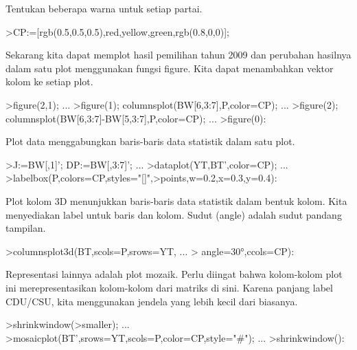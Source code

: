 \documentclass[a4paper,10pt]{article}
\begin{document}
\begin{eulernotebook}
\begin{eulercomment}
Tentukan beberapa warna untuk setiap partai.
\end{eulercomment}
\begin{eulerprompt}
>CP:=[rgb(0.5,0.5,0.5),red,yellow,green,rgb(0.8,0,0)];
\end{eulerprompt}
\begin{eulercomment}
Sekarang kita dapat memplot hasil pemilihan tahun 2009 dan perubahan
hasilnya dalam satu plot menggunakan fungsi figure. Kita dapat
menambahkan vektor kolom ke setiap plot.
\end{eulercomment}
\begin{eulerprompt}
>figure(2,1);  ...
>figure(1); columnsplot(BW[6,3:7],P,color=CP); ...
>figure(2); columnsplot(BW[6,3:7]-BW[5,3:7],P,color=CP);  ...
>figure(0):
\end{eulerprompt}
\begin{eulercomment}
Plot data menggabungkan baris-baris data statistik dalam satu plot.
\end{eulercomment}
\begin{eulerprompt}
>J:=BW[,1]'; DP:=BW[,3:7]'; ...
>dataplot(YT,BT',color=CP);  ...
>labelbox(P,colors=CP,styles="[]",>points,w=0.2,x=0.3,y=0.4):
\end{eulerprompt}
\begin{eulercomment}
Plot kolom 3D menunjukkan baris-baris data statistik dalam bentuk
kolom. Kita menyediakan label untuk baris dan kolom. Sudut (angle)
adalah sudut pandang tampilan.
\end{eulercomment}
\begin{eulerprompt}
>columnsplot3d(BT,scols=P,srows=YT, ...
>  angle=30°,ccols=CP):
\end{eulerprompt}
\begin{eulercomment}
Representasi lainnya adalah plot mozaik. Perlu diingat bahwa
kolom-kolom plot ini merepresentasikan kolom-kolom dari matriks di
sini. Karena panjang label CDU/CSU, kita menggunakan jendela yang
lebih kecil dari biasanya.
\end{eulercomment}
\begin{eulerprompt}
>shrinkwindow(>smaller);  ...
>mosaicplot(BT',srows=YT,scols=P,color=CP,style="#"); ...
>shrinkwindow():
\end{eulerprompt}

\end{eulernotebook}
\end{document}
